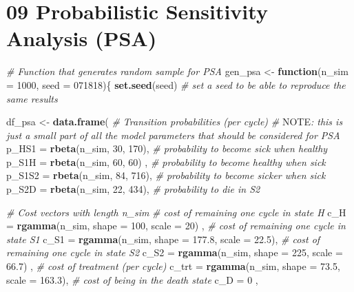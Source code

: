 \documentclass[
]{article}
\newenvironment{Shaded}{\begin{snugshade}}{\end{snugshade}}
\newcommand{\AlertTok}[1]{\textcolor[rgb]{0.94,0.16,0.16}{#1}}
\newcommand{\CommentTok}[1]{\textcolor[rgb]{0.56,0.35,0.01}{\textit{#1}}}
\newcommand{\ControlFlowTok}[1]{\textcolor[rgb]{0.13,0.29,0.53}{\textbf{#1}}}
\newcommand{\DataTypeTok}[1]{\textcolor[rgb]{0.13,0.29,0.53}{#1}}
\newcommand{\DecValTok}[1]{\textcolor[rgb]{0.00,0.00,0.81}{#1}}
\newcommand{\FloatTok}[1]{\textcolor[rgb]{0.00,0.00,0.81}{#1}}
\newcommand{\KeywordTok}[1]{\textcolor[rgb]{0.13,0.29,0.53}{\textbf{#1}}}
\newcommand{\NormalTok}[1]{#1}
\newcommand{\StringTok}[1]{\textcolor[rgb]{0.31,0.60,0.02}{#1}}
\begin{document}
\hypertarget{probabilistic-sensitivity-analysis-psa}{%
\section{09 Probabilistic Sensitivity Analysis
(PSA)}\label{probabilistic-sensitivity-analysis-psa}}

\begin{Shaded}
\begin{Highlighting}[]
\CommentTok{# Function that generates random sample for PSA}
\NormalTok{gen_psa <-}\StringTok{ }\ControlFlowTok{function}\NormalTok{(}\DataTypeTok{n_sim =} \DecValTok{1000}\NormalTok{, }\DataTypeTok{seed =} \DecValTok{071818}\NormalTok{)\{}
  \KeywordTok{set.seed}\NormalTok{(seed) }\CommentTok{# set a seed to be able to reproduce the same results}
  
\NormalTok{  df_psa <-}\StringTok{ }\KeywordTok{data.frame}\NormalTok{(}
    \CommentTok{# Transition probabilities (per cycle)}
    \CommentTok{# }\AlertTok{NOTE}\CommentTok{: this is just a small part of all the model parameters that should be considered for PSA}
    \DataTypeTok{p_HS1   =} \KeywordTok{rbeta}\NormalTok{(n_sim, }\DecValTok{30}\NormalTok{, }\DecValTok{170}\NormalTok{),          }\CommentTok{# probability to become sick when healthy}
    \DataTypeTok{p_S1H   =} \KeywordTok{rbeta}\NormalTok{(n_sim, }\DecValTok{60}\NormalTok{, }\DecValTok{60}\NormalTok{) ,          }\CommentTok{# probability to become healthy when sick}
    \DataTypeTok{p_S1S2  =} \KeywordTok{rbeta}\NormalTok{(n_sim, }\DecValTok{84}\NormalTok{, }\DecValTok{716}\NormalTok{),          }\CommentTok{# probability to become sicker when sick}
    \DataTypeTok{p_S2D   =} \KeywordTok{rbeta}\NormalTok{(n_sim, }\DecValTok{22}\NormalTok{, }\DecValTok{434}\NormalTok{),          }\CommentTok{# probability to die in S2}
    
    \CommentTok{# Cost vectors with length n_sim}
    \CommentTok{# cost of remaining one cycle in state H}
    \DataTypeTok{c_H     =} \KeywordTok{rgamma}\NormalTok{(n_sim, }\DataTypeTok{shape =} \DecValTok{100}\NormalTok{, }\DataTypeTok{scale =} \DecValTok{20}\NormalTok{)    ,        }
    \CommentTok{# cost of remaining one cycle in state S1}
    \DataTypeTok{c_S1    =} \KeywordTok{rgamma}\NormalTok{(n_sim, }\DataTypeTok{shape =} \FloatTok{177.8}\NormalTok{, }\DataTypeTok{scale =} \FloatTok{22.5}\NormalTok{),        }
    \CommentTok{# cost of remaining one cycle in state S2}
    \DataTypeTok{c_S2    =} \KeywordTok{rgamma}\NormalTok{(n_sim, }\DataTypeTok{shape =} \DecValTok{225}\NormalTok{, }\DataTypeTok{scale =} \FloatTok{66.7}\NormalTok{)  ,        }
    \CommentTok{# cost of treatment (per cycle)}
    \DataTypeTok{c_trt   =} \KeywordTok{rgamma}\NormalTok{(n_sim, }\DataTypeTok{shape =} \FloatTok{73.5}\NormalTok{, }\DataTypeTok{scale =} \FloatTok{163.3}\NormalTok{),        }
    \CommentTok{# cost of being in the death state}
    \DataTypeTok{c_D     =} \DecValTok{0}\NormalTok{                                         ,        }
    

\end{Highlighting}
\end{Shaded}
\end{document}
